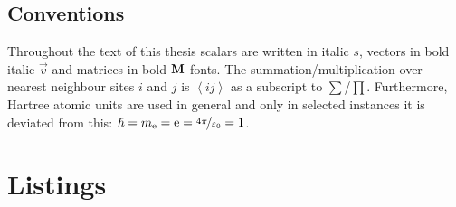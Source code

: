 \documentclass[ 10pt,
                DIV=10,
                headtopline=0.08em,
                headsepline=0.04em,
                headinclude,
                BCOR=6mm
              ]{scrbook}
\begin{document}
    
	\frontmatter
    
    {\hypersetup{hidelinks}\tableofcontents}%

    \clearpage
    \printglossary[type=\acronymtype]
    
    

    \section*{Conventions}
    Throughout the text of this thesis scalars are written in italic $s$, vectors in bold italic $\vec v$ and matrices in bold $\textbf M$ fonts. The summation/multiplication over nearest neighbour sites $i$ and $j$ is $\left\langle ij \right\rangle$ as a subscript to $\sum$/$\prod$. Furthermore, Hartree atomic units are used in general and only in selected instances it is deviated from this: $\hbar = m_\mathrm{e} = \mathrm e = \nicefrac{4\pi}{\varepsilon_0} = 1$. 
    \newpage
    \nonfrenchspacing

    \mainmatter
    \renewcommand{\thechapter}{\Roman{chapter}}
    

    

    

    

    \cleardoublepage
    \printbibliography

    \chapter*{Listings}
    \listoffigures
    \listoftables
\end{document}

